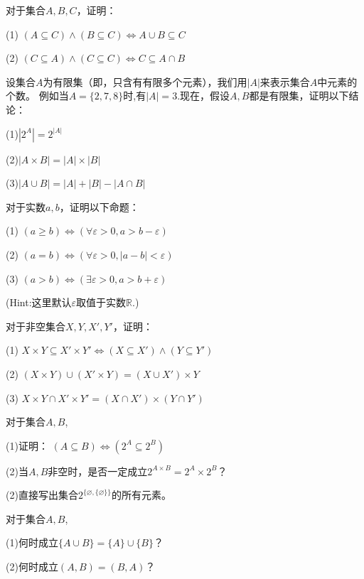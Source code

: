 \begin{prob}对于集合$A,B,C$，证明：

(1) $(A\subseteq C)\wedge(B\subseteq C)\Leftrightarrow A\cup B\subseteq C$

(2) $(C\subseteq A)\wedge(C\subseteq C)\Leftrightarrow C\subseteq A\cap B$
\end{prob}\vs

\begin{prob}[元素的个数]
设集合$A$为有限集（即，只含有有限多个元素），我们用$|A|$来表示集合$A$中元素的个数。
例如当$A=\{2,7,8\}$时,有$|A|=3$.现在，假设$A,B$都是有限集，证明以下结论：

(1)$|2^A|=2^{|A|}$

(2)$|A\times B|=|A|\times|B|$

(3)$|A\cup B|=|A|+|B|-|A\cap B|$
\end{prob}\vs


\begin{prob}对于实数$a,b$，证明以下命题：

(1) $(a\geq b)\Leftrightarrow(\forall\varepsilon>0,a>b-\varepsilon)$

(2) $(a=b)\Leftrightarrow(\forall\varepsilon>0,|a-b|<\varepsilon)$

(3) $(a>b)\Leftrightarrow(\exists\varepsilon>0,a>b+\varepsilon)$

\end{prob}

(Hint:这里默认$\varepsilon$取值于实数$\mathbb{R}$.)\vs

\begin{prob}对于非空集合$X,Y,X',Y'$，证明：

(1) $X\times Y\subseteq X'\times Y' \Leftrightarrow (X\subseteq X')\wedge(Y\subseteq Y')$

(2) $(X\times Y)\cup(X'\times Y)=(X\cup X')\times Y$

(3) $X\times Y\cap X'\times Y'=(X\cap X')\times(Y\cap Y')$
\end{prob}\vs

\begin{prob} 对于集合$A,B$,

(1)证明： $(A\subseteq B)\Leftrightarrow (2^A\subseteq 2^B)$

(2)当$A,B$非空时，是否一定成立$2^{A\times B}=2^A\times2^B$？

(2)直接写出集合$2^{\{\varnothing,\{\varnothing\}\}}$的所有元素。

\end{prob}\vs

\begin{prob}对于集合$A,B$,

(1)何时成立$\{A\cup B\}=\{A\}\cup\{B\}$？

(2)何时成立$(A,B)=(B,A)$？
\end{prob}\vs

